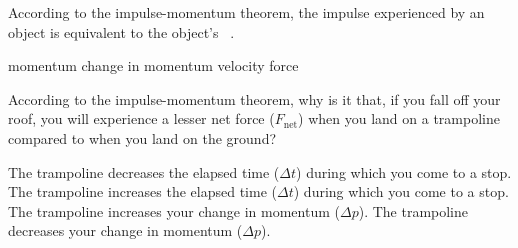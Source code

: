 \documentclass[../main-physics-problems.tex]{subfiles}
\begin{document}
\begin{questions}
\question
According to the impulse-momentum theorem, the impulse experienced by an object is equivalent to the object's \fillin\ .

\begin{randomizechoices}
\choice momentum
\correctchoice change in momentum
\choice velocity
\choice force
\end{randomizechoices}





\question
According to the impulse-momentum theorem, why is it that, if you fall off your roof, you will experience a lesser net force ($F_{\text{net}}$) when you land on a trampoline compared to when you land on the ground?

\begin{randomizechoices}
\choice The trampoline decreases the elapsed time ($\Delta t$) during which you come to a stop.
\correctchoice The trampoline increases the elapsed time ($\Delta t$) during which you come to a stop.
\choice The trampoline increases your change in momentum ($\Delta p$).
\choice The trampoline decreases your change in momentum ($\Delta p$).
\end{randomizechoices}




\end{questions}
\end{document}
